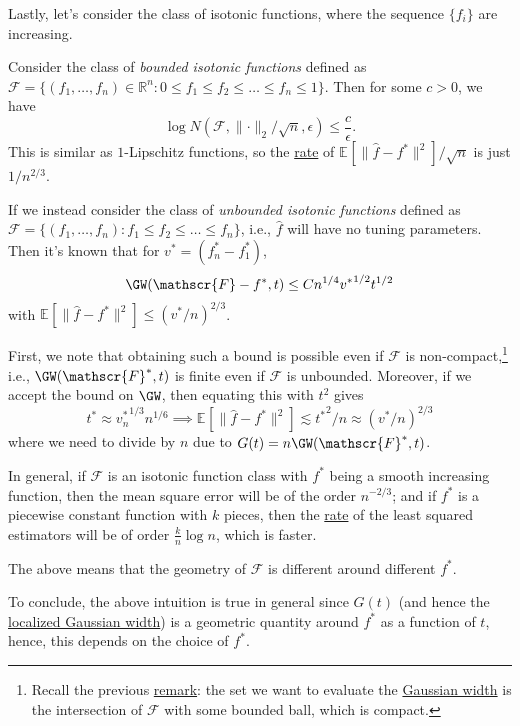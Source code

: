 Lastly, let's consider the class of isotonic functions, where the sequence \(\{ f_i \} \) are increasing.

\begin{eg}
	Consider the class of \emph{bounded isotonic functions} defined as \(\mathscr{F} = \{(f_1, \dots , f_n) \in \mathbb{R} ^n \colon 0 \leq f_1 \leq f_2 \leq \dots \leq f_n \leq 1 \}\). Then for some \(c > 0\), we have
	\[
		\log N(\mathscr{F} , \lVert \cdot \rVert _2 / \sqrt{n} , \epsilon ) \leq \frac{c}{\epsilon }.
	\]
	This is similar as \(1\)-Lipschitz functions, so the \hyperref[def:rate-of-convergence]{rate} of \(\mathbb{E}_{}[\lVert \hat{f} - f^{\ast} \rVert ^2 ] / \sqrt{n} \) is just \(1 / n^{2 / 3}\).
\end{eg}

\begin{eg}
	If we instead consider the class of \emph{unbounded isotonic functions} defined as \(\mathscr{F} = \{(f_1, \dots , f_n) \colon f_1 \leq f_2 \leq \dots \leq f_n \}\), i.e., \(\hat{f} \) will have no tuning parameters. Then it's known that for \(v^{\ast} = (f^{\ast} _n - f^{\ast} _1)\),
	\[
		\GW(\mathscr{F} - f^{\ast} , t) \leq C n^{1 / 4} {v^{\ast} }^{1 / 2} t^{1 / 2}
	\]
	with \(\mathbb{E}_{}[\lVert \hat{f} - f^{\ast}  \rVert ^2 ] \leq (v^{\ast} / n)^{2 / 3}\).
\end{eg}
\begin{explanation}
	First, we note that obtaining such a bound is possible even if \(\mathscr{F} \) is non-compact,\footnote{Recall the previous \hyperref[rmk:GW]{remark}: the set we want to evaluate the \hyperref[def:Gaussian-width]{Gaussian width} is the intersection of \(\mathscr{F} \) with some bounded ball, which is compact.} i.e., \(\GW(\mathscr{F} ^{\ast} , t)\) is finite even if \(\mathscr{F} \) is unbounded. Moreover, if we accept the bound on \(\GW\), then equating this with \(t^2\) gives
	\[
		t^{\ast} \approx {v^{\ast} _n}^{1 / 3} n^{1 / 6}
		\implies \mathbb{E}_{}\left[\lVert \hat{f} - f^{\ast} \rVert ^2 \right] \lesssim {t^{\ast} }^2 / n \approx (v^{\ast} / n)^{2 / 3}
	\]
	where we need to divide by \(n\) due to \(G(t) = n \GW(\mathscr{F} ^{\ast} , t)\).
\end{explanation}

In general, if \(\mathscr{F} \) is an isotonic function class with \(f^{\ast} \) being a smooth increasing function, then the mean square error will be of the order \(n^{-2 / 3}\); and if \(f^{\ast} \) is a piecewise constant function with \(k\) pieces, then the \hyperref[def:rate-of-convergence]{rate} of the least squared estimators will be of order \(\frac{k}{n}\log n\), which is faster.

\begin{intuition}
	The above means that the geometry of \(\mathscr{F} \) is different around different \(f^{\ast} \).
\end{intuition}

To conclude, the above intuition is true in general since \(G(t)\) (and hence the \hyperref[def:localized-Gaussian-width]{localized Gaussian width}) is a geometric quantity around \(f^{\ast} \) as a function of \(t\), hence, this depends on the choice of \(f^{\ast} \).